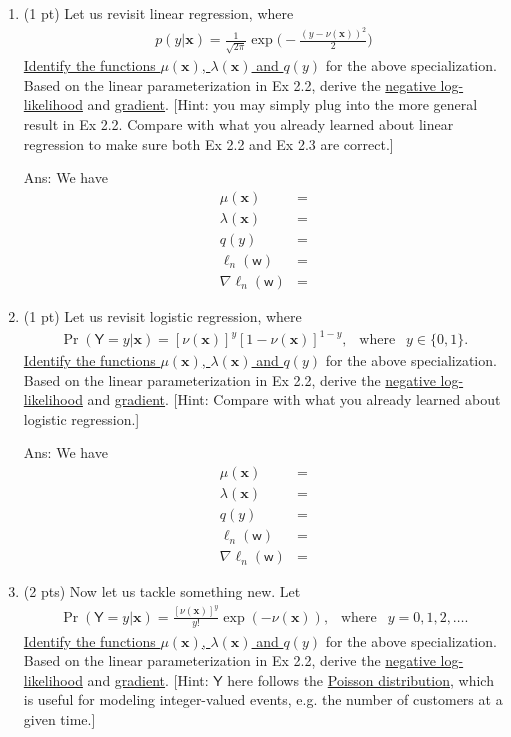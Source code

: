 \documentclass[10pt,letter,notitlepage]{article}
\newcommand{\xv}{\mathbf{x}}
\newcommand{\wbs}{\bm{\mathsf{w}}}
\newcommand{\Ysf}{\mathsf{Y}}
\newcommand{\eg}{{e.g.}\xspace}
\newcommand{\ans}[1]{{\color{orange}\textsf{Ans}: #1}}
\begin{document}
\begin{exercise}
\begin{enumerate}
\ans{
We have 
\begin{align}
\ell_n(\wbs) = 
\end{align}
and hence 
\begin{align}
\nabla \ell_n(\wbs) =
\end{align}
}


\item (1 pt) Let us revisit linear regression, where 
	\begin{align}
	p(y | \xv) =\tfrac{1}{\sqrt{2\pi}}\exp\big(-\tfrac{(y - \nu(\xv))^2}{2}\big)
	\end{align}
	\uline{Identify the functions $\mu(\xv)$, $\lambda(\xv)$ and $q(y)$} for the above specialization. Based on the linear parameterization in Ex 2.2, derive the \uline{negative log-likelihood} and \uline{gradient}. [Hint: you may simply plug into the more general result in Ex 2.2. Compare with what you already learned about linear regression to make sure both Ex 2.2 and Ex 2.3 are correct.]
	
\ans{
We have 
\begin{align}
\mu(\xv) &=  \\
\lambda(\xv) &= \\
q(y) &=  \\
\ell_n(\wbs) &= \\
\nabla\ell_n(\wbs) &=
\end{align}
}

\item (1 pt) Let us revisit logistic regression, where 
	\begin{align}
	\Pr( \Ysf = y | \xv) =[\nu(\xv)]^{y} [1-\nu(\xv)]^{1-y}, ~~\mbox{ where } ~~ y \in \{0, 1\}.
	\end{align}
	\uline{Identify the functions $\mu(\xv)$, $\lambda(\xv)$ and $q(y)$} for the above specialization. Based on the linear parameterization in Ex 2.2, derive the \uline{negative log-likelihood} and \uline{gradient}.  [Hint: Compare with what you already learned about logistic regression.]
	
\ans{
We have 
\begin{align}
\mu(\xv) &=  \\
\lambda(\xv) &= \\
q(y) &=  \\
\ell_n(\wbs) &= \\
\nabla\ell_n(\wbs) &=
\end{align}
}

\item (2 pts) Now let us tackle something new. Let 
	\begin{align}
	\Pr(\Ysf = y | \xv) = \frac{[\nu(\xv)]^y}{y!} \exp(-\nu(\xv)), ~~ \mbox{ where } ~~ y = 0, 1, 2, \ldots.
	\end{align}
	\uline{Identify the functions $\mu(\xv)$, $\lambda(\xv)$ and $q(y)$} for the above specialization. Based on the linear parameterization in Ex 2.2, derive the \uline{negative log-likelihood} and \uline{gradient}. [Hint: $\Ysf$ here follows the \href{https://en.wikipedia.org/wiki/Poisson_distribution}{Poisson distribution}, which is useful for modeling integer-valued events, \eg the number of customers at a given time.]
	

\end{enumerate}
\end{exercise}
\end{document}
